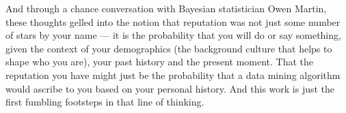 And through a chance conversation with Bayesian statistician
Owen Martin, these thoughts gelled into the notion that reputation
was not just some number of stars by your name --- it is the probability
that you will do or say something, given the context of your demographics
(\ie the background culture that helps to shape who you are),
your past history and the present moment.
That the reputation you have might just be the probability
that a data mining algorithm would ascribe to you based on your personal history.
And this work is just the first fumbling footsteps in that line of thinking.

